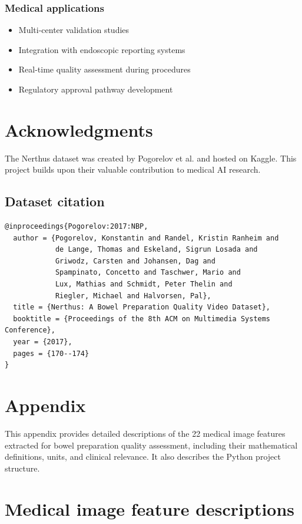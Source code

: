 \documentclass[11pt]{article}
\begin{document}
\subsubsection{Medical applications}
\begin{itemize}
    \item Multi-center validation studies
    \item Integration with endoscopic reporting systems
    \item Real-time quality assessment during procedures
    \item Regulatory approval pathway development
\end{itemize}

\section*{Acknowledgments}

The Nerthus dataset was created by Pogorelov et al. and hosted on Kaggle. This project builds upon their valuable contribution to medical AI research.

\subsection*{Dataset citation}
\begin{verbatim}
@inproceedings{Pogorelov:2017:NBP,
  author = {Pogorelov, Konstantin and Randel, Kristin Ranheim and 
            de Lange, Thomas and Eskeland, Sigrun Losada and 
            Griwodz, Carsten and Johansen, Dag and 
            Spampinato, Concetto and Taschwer, Mario and 
            Lux, Mathias and Schmidt, Peter Thelin and 
            Riegler, Michael and Halvorsen, Pal},
  title = {Nerthus: A Bowel Preparation Quality Video Dataset},
  booktitle = {Proceedings of the 8th ACM on Multimedia Systems Conference},
  year = {2017},
  pages = {170--174}
}
\end{verbatim}

\appendix
\section{Appendix}
\label{app:appendix}

This appendix provides detailed descriptions of the 22 medical image features extracted for bowel preparation quality assessment, including their mathematical definitions, units, and clinical relevance. It also describes the Python project structure.

\section{Medical image feature descriptions}
\label{app:feature_descriptions}
\end{document}
